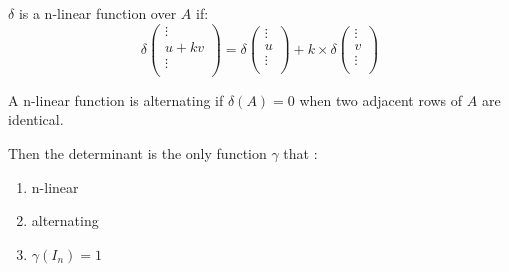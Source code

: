 \begin{definition}
    $\delta$ is a n-linear function over $A$ if:
    \begin{equation}
        \delta \begin{pmatrix}
            \vdots \\
            u + kv \\
            \vdots \\
        \end{pmatrix} = \delta \begin{pmatrix}
            \vdots \\
            u \\
            \vdots \\
        \end{pmatrix} + k \times \delta \begin{pmatrix}
            \vdots \\
            v \\
            \vdots \\
        \end{pmatrix} 
    \end{equation}
\end{definition}


\begin{definition}[alternating]
    A n-linear function is alternating if $\delta (A) = 0$ when two adjacent rows of $A$ are identical.
\end{definition}

Then the determinant is the only function $\gamma$ that :
\begin{enumerate}
    \item n-linear
    \item alternating
    \item $\gamma(I_n) = 1$
\end{enumerate}


